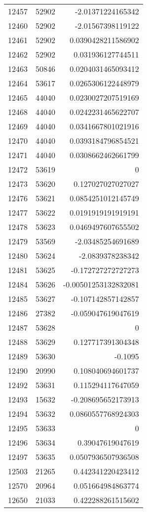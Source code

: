 \begin{tabular}{r | r | r}
12457 & 52902 & -2.01371224165342 \\
12460 & 52902 & -2.01567398119122 \\
12461 & 52902 & 0.0390428211586902 \\
12462 & 52902 & 0.031936127744511 \\
12463 & 50846 & 0.0204031465093412 \\
12464 & 53617 & 0.0265306122448979 \\
12465 & 44040 & 0.0230027207519169 \\
12468 & 44040 & 0.0242231465622707 \\
12469 & 44040 & 0.0341667801021916 \\
12470 & 44040 & 0.0393184796854521 \\
12471 & 44040 & 0.0308662462661799 \\
12472 & 53619 & 0 \\
12473 & 53620 & 0.127027027027027 \\
12476 & 53621 & 0.0854251012145749 \\
12477 & 53622 & 0.0191919191919191 \\
12478 & 53623 & 0.0469497607655502 \\
12479 & 53569 & -2.03485254691689 \\
12480 & 53624 & -2.0839378238342 \\
12481 & 53625 & -0.172727272727273 \\
12484 & 53626 & -0.00501253132832081 \\
12485 & 53627 & -0.107142857142857 \\
12486 & 27382 & -0.059047619047619 \\
12487 & 53628 & 0 \\
12488 & 53629 & 0.127717391304348 \\
12489 & 53630 & -0.1095 \\
12490 & 20990 & 0.108040694601737 \\
12492 & 53631 & 0.115294117647059 \\
12493 & 15632 & -0.208695652173913 \\
12494 & 53632 & 0.0860557768924303 \\
12495 & 53633 & 0 \\
12496 & 53634 & 0.39047619047619 \\
12497 & 53635 & 0.0507936507936508 \\
12503 & 21265 & 0.442341220423412 \\
12570 & 20964 & 0.051664984863774 \\
12650 & 21033 & 0.422288261515602 \\

\end{tabular}
